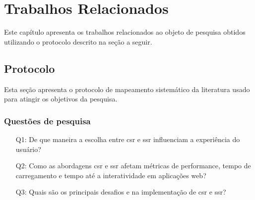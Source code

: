 \chapter{Trabalhos Relacionados}
\label{cap:trabalhos}
Este capítulo apresenta os trabalhos relacionados ao objeto de pesquisa obtidos utilizando o protocolo descrito na seção a seguir.

\section{Protocolo}
Esta seção apresenta o protocolo de mapeamento sistemático da literatura usado para atingir os objetivos da pesquisa.

\subsection{Questões de pesquisa}
\label{section:questoes_pesquisa}
\begin{enumerate}
    \item[Q1:] De que maneira a escolha entre \acrshort{csr} e \acrshort{ssr} influenciam a experiência do usuário?
    \item[Q2:] Como as abordagens \acrshort{csr} e \acrshort{ssr} afetam métricas de performance, tempo de carregamento e tempo até a interatividade em aplicações web?
    \item[Q3:] Quais são os principais desafios e  na implementação de \acrshort{csr} e \acrshort{ssr}?
\end{enumerate}

